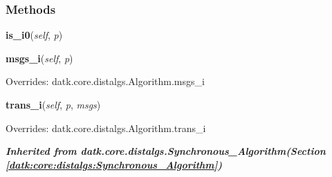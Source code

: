 
  \subsubsection{Methods}

    \label{datk:core:algs:SynchBFSAck:is_i0}

    \vspace{0.5ex}

\hspace{.8\funcindent}\begin{boxedminipage}{\funcwidth}

    \raggedright \textbf{is\_i0}(\textit{self}, \textit{p})

\setlength{\parskip}{2ex}
\setlength{\parskip}{1ex}
    \end{boxedminipage}

    \vspace{0.5ex}

\hspace{.8\funcindent}\begin{boxedminipage}{\funcwidth}

    \raggedright \textbf{msgs\_i}(\textit{self}, \textit{p})

\setlength{\parskip}{2ex}
\setlength{\parskip}{1ex}
      Overrides: datk.core.distalgs.Algorithm.msgs\_i

    \end{boxedminipage}

    \vspace{0.5ex}

\hspace{.8\funcindent}\begin{boxedminipage}{\funcwidth}

    \raggedright \textbf{trans\_i}(\textit{self}, \textit{p}, \textit{msgs})

\setlength{\parskip}{2ex}
\setlength{\parskip}{1ex}
      Overrides: datk.core.distalgs.Algorithm.trans\_i

    \end{boxedminipage}


\large{\textbf{\textit{Inherited from datk.core.distalgs.Synchronous\_Algorithm\textit{(Section \ref{datk:core:distalgs:Synchronous_Algorithm})}}}}

